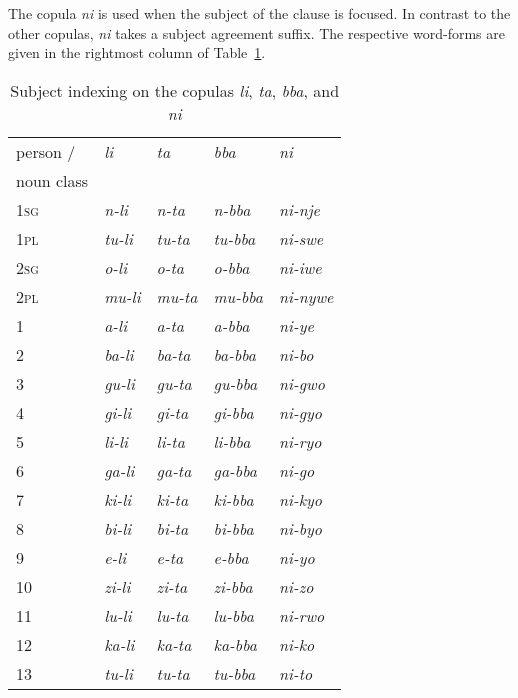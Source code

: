 The copula \textit{ni} is used when the subject of the clause is focused. 
In contrast to the other copulas, \textit{ni} takes a subject agreement suffix. 
The respective word-forms are given in the rightmost column of Table~\ref{tab-cop-agreement}. 

\begin{table}[!hbt]
\caption{Subject indexing on the copulas \textit{li}, \textit{ta}, \textit{bba}, and \textit{ni}}
\label{tab-cop-agreement}
	\begin{tabular}{llll l}
\lsptoprule
	person / &\textit{li}	& \textit{ta}	& \textit{bba} & \textit{ni}\\
	noun class	 		&			&		&	 & \\
\midrule
	1\textsc{sg}&\textit{n-li}&\textit{n-ta}&\textit{n-bba}		&\textit{ni-nje}\\
	1\textsc{pl}&\textit{tu-li}&\textit{tu-ta}&\textit{tu-bba}		&\textit{ni-swe}\\
	2\textsc{sg}&\textit{o-li}&\textit{o-ta}&\textit{o-bba}	&\textit{ni-iwe}\\
	2\textsc{pl}&\textit{mu-li}&\textit{mu-ta}&\textit{mu-bba}	&\textit{ni-nywe}\\
	1&\textit{a-li}&\textit{a-ta}&\textit{a-bba}			&\textit{ni-ye}\\
	2&\textit{ba-li}&\textit{ba-ta}&\textit{ba-bba}		&\textit{ni-bo}\\
	3&\textit{gu-li}&\textit{gu-ta}&\textit{gu-bba}		&\textit{ni-gwo}\\
	4&\textit{gi-li}&\textit{gi-ta}&\textit{gi-bba}			&\textit{ni-gyo}\\
	5&\textit{li-li}&\textit{li-ta}&\textit{li-bba}			&\textit{ni-ryo}\\
	6&\textit{ga-li}&\textit{ga-ta}&\textit{ga-bba}		&\textit{ni-go}\\
	7&\textit{ki-li}&\textit{ki-ta}&\textit{ki-bba}		&\textit{ni-kyo}\\
	8&\textit{bi-li}&\textit{bi-ta}&\textit{bi-bba}		&\textit{ni-byo}\\
	9&\textit{e-li}&\textit{e-ta}&\textit{e-bba}			&\textit{ni-yo}\\
	10&\textit{zi-li}&\textit{zi-ta}&\textit{zi-bba}		&\textit{ni-zo}\\
	11&\textit{lu-li}&\textit{lu-ta}&\textit{lu-bba}		&\textit{ni-rwo}\\
	12&\textit{ka-li}&\textit{ka-ta}&\textit{ka-bba}		&\textit{ni-ko}\\
	13&\textit{tu-li}&\textit{tu-ta}&\textit{tu-bba}		&\textit{ni-to}\\

\end{tabular}
\end{table}
